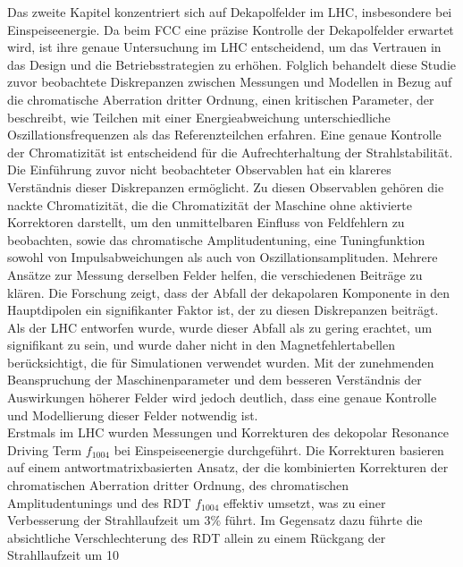 {%
Das zweite Kapitel konzentriert sich auf Dekapolfelder im LHC, insbesondere bei Einspeiseenergie. Da beim FCC eine präzise Kontrolle der Dekapolfelder erwartet wird, ist ihre genaue Untersuchung im LHC entscheidend, um das Vertrauen in das Design und die Betriebsstrategien zu erhöhen. Folglich behandelt diese Studie zuvor beobachtete Diskrepanzen zwischen Messungen und Modellen in Bezug auf die chromatische Aberration dritter Ordnung, einen kritischen Parameter, der beschreibt, wie Teilchen mit einer Energieabweichung unterschiedliche Oszillationsfrequenzen als das Referenzteilchen erfahren. Eine genaue Kontrolle der Chromatizität ist entscheidend für die Aufrechterhaltung der Strahlstabilität. Die Einführung zuvor nicht beobachteter Observablen hat ein klareres Verständnis dieser Diskrepanzen ermöglicht. Zu diesen Observablen gehören die nackte Chromatizität, die die Chromatizität der Maschine ohne aktivierte Korrektoren darstellt, um den unmittelbaren Einfluss von Feldfehlern zu beobachten, sowie das chromatische Amplitudentuning, eine Tuningfunktion sowohl von Impulsabweichungen als auch von Oszillationsamplituden. Mehrere Ansätze zur Messung derselben Felder helfen, die verschiedenen Beiträge zu klären. Die Forschung zeigt, dass der Abfall der dekapolaren Komponente in den Hauptdipolen ein signifikanter Faktor ist, der zu diesen Diskrepanzen beiträgt. Als der LHC entworfen wurde, wurde dieser Abfall als zu gering erachtet, um signifikant zu sein, und wurde daher nicht in den Magnetfehlertabellen berücksichtigt, die für Simulationen verwendet wurden. Mit der zunehmenden Beanspruchung der Maschinenparameter und dem besseren Verständnis der Auswirkungen höherer Felder wird jedoch deutlich, dass eine genaue Kontrolle und Modellierung dieser Felder notwendig ist.
\\
\indent
Erstmals im LHC wurden Messungen und Korrekturen des dekopolar Resonance Driving Term $f_{1004}$ bei Einspeiseenergie durchgeführt. Die Korrekturen basieren auf einem antwortmatrixbasierten Ansatz, der die kombinierten Korrekturen der chromatischen Aberration dritter Ordnung, des chromatischen Amplitudentunings und des RDT $f_{1004}$ effektiv umsetzt, was zu einer Verbesserung der Strahllaufzeit um $3\%$ führt. Im Gegensatz dazu führte die absichtliche Verschlechterung des RDT allein zu einem Rückgang der Strahllaufzeit um 10 %

}
